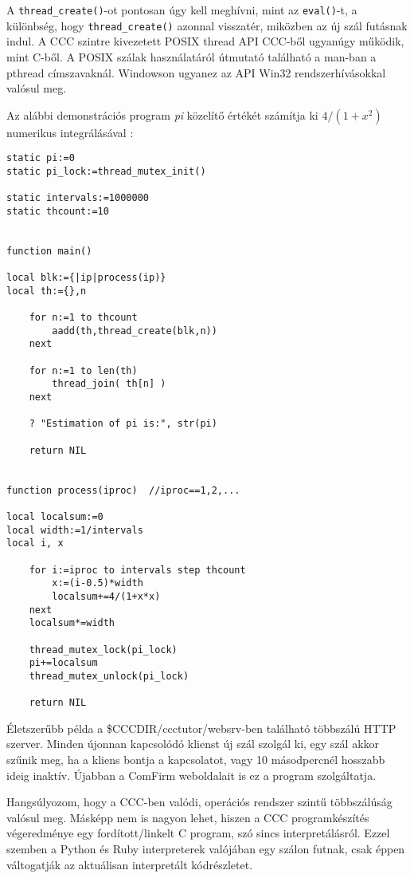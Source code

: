 A \verb!thread_create()!-ot pontosan úgy kell meghívni, 
mint az \verb!eval()!-t, a különbség,
hogy \verb!thread_create()! azonnal visszatér,
miközben az új szál futásnak indul.
A CCC szintre kivezetett POSIX thread API CCC-ből ugyanúgy működik, 
mint C-ből. A POSIX szálak használatáról útmutató található a man-ban 
a pthread  címszavaknál. Windowson ugyanez az API Win32 rendszerhívásokkal
valósul meg.

Az alábbi demonstrációs program {\it pi\/} közelítő értékét 
számítja ki $4/(1+x^2)$ numerikus integrálásával :

\begin{verbatim}
static pi:=0
static pi_lock:=thread_mutex_init()

static intervals:=1000000
static thcount:=10


function main()

local blk:={|ip|process(ip)}
local th:={},n
 
    for n:=1 to thcount
        aadd(th,thread_create(blk,n))
    next

    for n:=1 to len(th)
        thread_join( th[n] )
    next

    ? "Estimation of pi is:", str(pi)
    
    return NIL
 

function process(iproc)  //iproc==1,2,...

local localsum:=0
local width:=1/intervals 
local i, x

    for i:=iproc to intervals step thcount
        x:=(i-0.5)*width
        localsum+=4/(1+x*x)
    next
    localsum*=width

    thread_mutex_lock(pi_lock)
    pi+=localsum
    thread_mutex_unlock(pi_lock)

    return NIL

\end{verbatim}

Életszerűbb példa a \$CCCDIR/ccctutor/websrv-ben  található
többszálú HTTP szerver. Minden újonnan kapcsolódó klienst új
szál szolgál ki, egy szál akkor szűnik meg, ha a kliens
bontja a kapcsolatot, vagy 10 másodpercnél hosszabb ideig 
inaktív. Újabban a ComFirm weboldalait is ez a program
szolgáltatja.

Hangsúlyozom, hogy a CCC-ben valódi, operációs rendszer szintű 
többszálúság valósul meg. Másképp nem is nagyon lehet, hiszen
a CCC programkészítés végeredménye egy fordított/linkelt C program,
szó sincs interpretálásról. Ezzel szemben a Python és Ruby 
interpreterek valójában egy szálon futnak, csak éppen váltogatják
az aktuálisan interpretált  kódrészletet.


